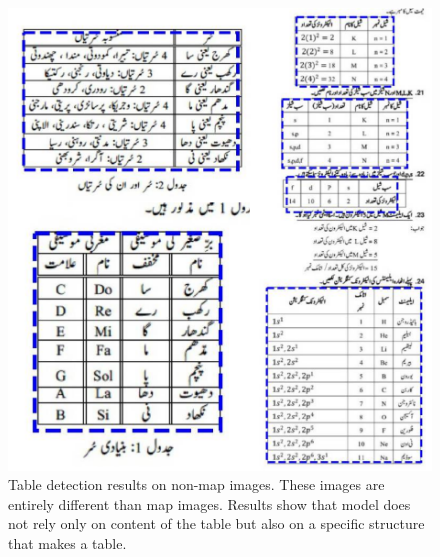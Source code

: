 \begin{figure}[h!]
    \centering
    \includegraphics[width=\linewidth, angle=0]{tables_nonMapImages.pdf}
    \caption{Table detection results on non-map images. These images are entirely different than map images. Results show that model does not rely only on content of the table but also on a specific structure that makes a table.}
    \label{fig:nonMapImages}
\end{figure}
